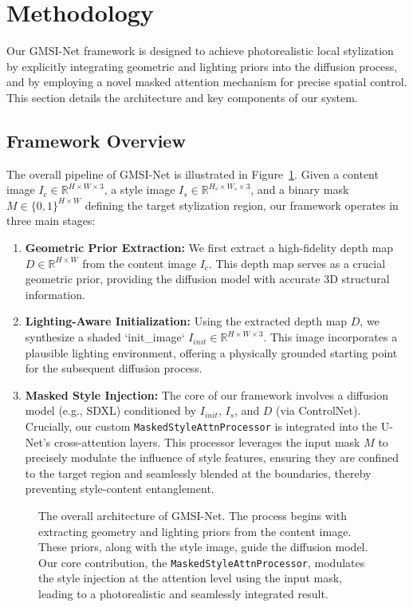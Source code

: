 \section{Methodology}

Our GMSI-Net framework is designed to achieve photorealistic local stylization by explicitly integrating geometric and lighting priors into the diffusion process, and by employing a novel masked attention mechanism for precise spatial control. This section details the architecture and key components of our system.

\subsection{Framework Overview}

The overall pipeline of GMSI-Net is illustrated in Figure~\ref{fig:framework}. Given a content image $I_c \in \mathbb{R}^{H \times W \times 3}$, a style image $I_s \in \mathbb{R}^{H_s \times W_s \times 3}$, and a binary mask $M \in \{0, 1\}^{H \times W}$ defining the target stylization region, our framework operates in three main stages:
\begin{enumerate}
    \item \textbf{Geometric Prior Extraction:} We first extract a high-fidelity depth map $D \in \mathbb{R}^{H \times W}$ from the content image $I_c$. This depth map serves as a crucial geometric prior, providing the diffusion model with accurate 3D structural information.
    \item \textbf{Lighting-Aware Initialization:} Using the extracted depth map $D$, we synthesize a shaded `init_image` $I_{init} \in \mathbb{R}^{H \times W \times 3}$. This image incorporates a plausible lighting environment, offering a physically grounded starting point for the subsequent diffusion process.
    \item \textbf{Masked Style Injection:} The core of our framework involves a diffusion model (e.g., SDXL) conditioned by $I_{init}$, $I_s$, and $D$ (via ControlNet). Crucially, our custom \texttt{MaskedStyleAttnProcessor} is integrated into the U-Net's cross-attention layers. This processor leverages the input mask $M$ to precisely modulate the influence of style features, ensuring they are confined to the target region and seamlessly blended at the boundaries, thereby preventing style-content entanglement.
\end{enumerate}

\begin{figure}[h]
  \centering
  \caption{The overall architecture of GMSI-Net. The process begins with extracting geometry and lighting priors from the content image. These priors, along with the style image, guide the diffusion model. Our core contribution, the \texttt{MaskedStyleAttnProcessor}, modulates the style injection at the attention level using the input mask, leading to a photorealistic and seamlessly integrated result.}\n  \label{fig:framework}
\end{figure}

